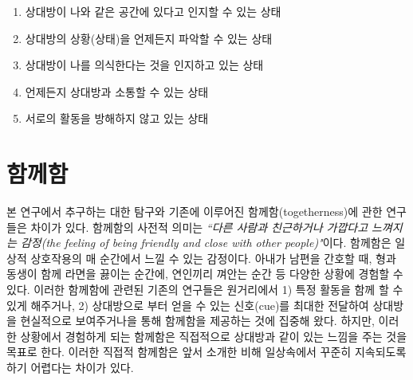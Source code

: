 \begin{center}
\begin{minipage}{.6\textwidth}
\begin{enumerate}[label=\Roman*., noitemsep]
	\item 상대방이 나와 같은 공간에 있다고 인지할 수 있는 상태
	\item 상대방의 상황(상태)을 언제든지 파악할 수 있는 상태
	\item 상대방이 나를 의식한다는 것을 인지하고 있는 상태
	\item 언제든지 상대방과 소통할 수 있는 상태
	\item 서로의 활동을 방해하지 않고 있는 상태
\end{enumerate}
\end{minipage}
\end{center}


\section{ 함께함}

본 연구에서 추구하는  대한 탐구와 기존에 이루어진 함께함(togetherness)에 관한 연구들은 차이가 있다. 함께함의 사전적 의미는 \textit{``다른 사람과 친근하거나 가깝다고 느껴지는 감정(the feeling of being friendly and close with other people)"}이다\cite{def_togetherness}.
함께함은 일상적 상호작용의 매 순간에서 느낄 수 있는 감정이다.
아내가 남편을 간호할 때, 형과 동생이 함께 라면을 끓이는 순간에, 연인끼리 껴안는 순간 등 다양한 상황에 경험할 수 있다. 
이러한 함께함에 관련된 기존의 연구들은 원거리에서 
1) 특정 활동을 함께 할 수 있게 해주거나\cite{flexNfeel}, 
2) 상대방으로 부터 얻을 수 있는 신호(cue)를 최대한 전달하여 상대방을 현실적으로 보여주거나\cite{orts2016holoportation, gibbs1999teleport}을 통해 함께함을 제공하는 것에 집중해 왔다.
하지만, 이러한 상황에서 경험하게 되는 함께함은 직접적으로 상대방과 같이 있는 느낌을 주는 것을 목표로 한다. 이러한 직접적 함께함은 앞서 소개한  비해 일상속에서 꾸준히 지속되도록 하기 어렵다는  차이가 있다.



